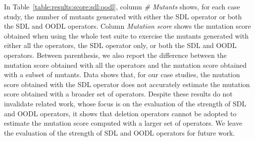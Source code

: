 In Table~\ref{table:results:score:sdl:oodl}, column \emph{\# Mutants} shows, for each case study, the number of mutants generated with either the SDL operator or both the SDL and OODL operators. 
Column \emph{Mutation score} shows the mutation score obtained when using the whole test suite to exercise the mutants generated with either all the operators, the SDL operator only, or both the SDL and OODL operators. Between parenthesis, we also report the difference between the mutation score obtained with all the operators and the mutation score obtained with a subset of mutants. {Data shows that, for our case studies, the mutation score obtained with the SDL operator does not accurately estimate the mutation score obtained with a broader set of operators. Despite these results do not invalidate related work, whose focus is on the evaluation of the strength of SDL and OODL operators, it shows that deletion operators cannot be adopted to estimate the mutation score computed with a larger set of operators. We leave the evaluation of the strength of SDL and OODL operators for future work.}




%
%

%

